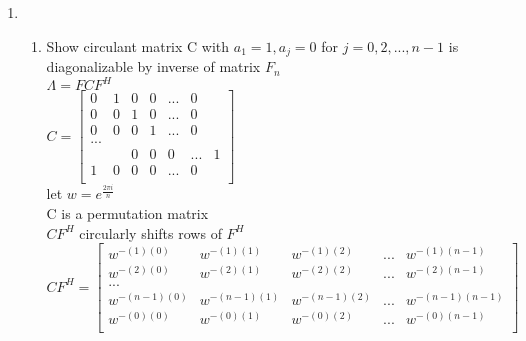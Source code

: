 \documentclass[12pt,letter]{article}
\begin{document}
\begin{enumerate}
  \item 
    \begin{enumerate}
    \item Show circulant matrix C with $a_1=1, a_j=0$ for $j=0,2,...,n-1$ is diagonalizable by inverse of matrix $F_n$\\      
      $\Lambda = FCF^H$\\
      $C=\begin{bmatrix}
        0 & 1 & 0 & 0 &... & 0\\
        0 & 0 & 1 & 0 &... & 0\\
        0 & 0 & 0 & 1 &... & 0\\
        ... & & & & & & \\
        & & 0 & 0 & 0 &... & 1\\
        1 & 0 & 0 & 0 &... & 0\\
      \end{bmatrix}$\\
      let $w=e^{\frac{2 \pi i}{n}}$\\
      C is a permutation matrix\\
      $CF^H$ circularly shifts rows of $F^H$\\
      $CF^H = \begin{bmatrix}
        w^{-(1)(0)} & w^{-(1)(1)} & w^{-(1)(2)} & ... & w^{-(1)(n-1)} \\
        w^{-(2)(0)} & w^{-(2)(1)} & w^{-(2)(2)} & ... & w^{-(2)(n-1)} \\
        ... & & & & \\
        w^{-(n-1)(0)} & w^{-(n-1)(1)} & w^{-(n-1)(2)} & ... & w^{-(n-1)(n-1)} \\
        w^{-(0)(0)} & w^{-(0)(1)} & w^{-(0)(2)} & ... & w^{-(0)(n-1)} \\
      \end{bmatrix}$\\


\end{enumerate}
\end{enumerate}
\end{document}
